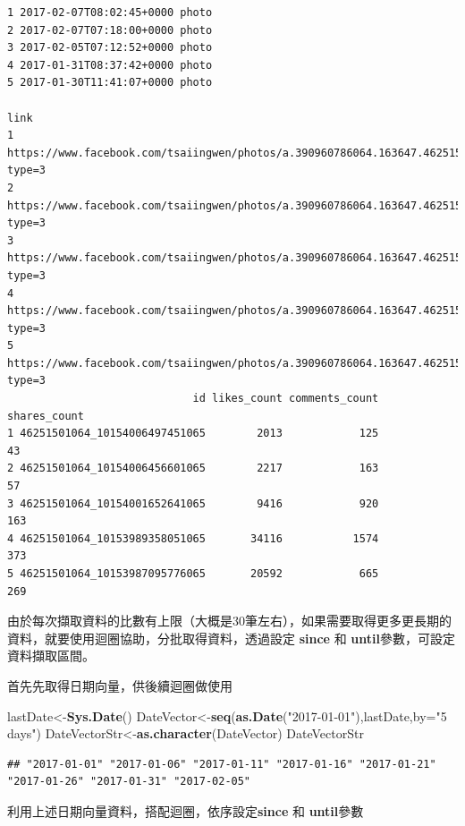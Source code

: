 \documentclass[]{book}
\newenvironment{Shaded}{\begin{snugshade}}{\end{snugshade}}
\newcommand{\KeywordTok}[1]{\textcolor[rgb]{0.13,0.29,0.53}{\textbf{{#1}}}}
\newcommand{\DataTypeTok}[1]{\textcolor[rgb]{0.13,0.29,0.53}{{#1}}}
\newcommand{\StringTok}[1]{\textcolor[rgb]{0.31,0.60,0.02}{{#1}}}
\newcommand{\NormalTok}[1]{{#1}}
\theoremstyle{definition}
\theoremstyle{definition}
\theoremstyle{remark}
\begin{document}
\begin{verbatim}
1 2017-02-07T08:02:45+0000 photo
2 2017-02-07T07:18:00+0000 photo
3 2017-02-05T07:12:52+0000 photo
4 2017-01-31T08:37:42+0000 photo
5 2017-01-30T11:41:07+0000 photo
                                                                                                    link
1 https://www.facebook.com/tsaiingwen/photos/a.390960786064.163647.46251501064/10154006497206065/?type=3
2 https://www.facebook.com/tsaiingwen/photos/a.390960786064.163647.46251501064/10154006455396065/?type=3
3 https://www.facebook.com/tsaiingwen/photos/a.390960786064.163647.46251501064/10154001652641065/?type=3
4 https://www.facebook.com/tsaiingwen/photos/a.390960786064.163647.46251501064/10153989357181065/?type=3
5 https://www.facebook.com/tsaiingwen/photos/a.390960786064.163647.46251501064/10153987089121065/?type=3
                             id likes_count comments_count shares_count
1 46251501064_10154006497451065        2013            125           43
2 46251501064_10154006456601065        2217            163           57
3 46251501064_10154001652641065        9416            920          163
4 46251501064_10153989358051065       34116           1574          373
5 46251501064_10153987095776065       20592            665          269
\end{verbatim}

由於每次擷取資料的比數有上限（大概是30筆左右），如果需要取得更多更長期的資料，就要使用迴圈協助，分批取得資料，透過設定
\textbf{since} 和 \textbf{until}參數，可設定資料擷取區間。

首先先取得日期向量，供後續迴圈做使用

\begin{Shaded}
\begin{Highlighting}[]
\NormalTok{lastDate<-}\KeywordTok{Sys.Date}\NormalTok{()}
\NormalTok{DateVector<-}\KeywordTok{seq}\NormalTok{(}\KeywordTok{as.Date}\NormalTok{(}\StringTok{"2017-01-01"}\NormalTok{),lastDate,}\DataTypeTok{by=}\StringTok{"5 days"}\NormalTok{)}
\NormalTok{DateVectorStr<-}\KeywordTok{as.character}\NormalTok{(DateVector)}
\NormalTok{DateVectorStr}
\end{Highlighting}
\end{Shaded}

\begin{verbatim}
## "2017-01-01" "2017-01-06" "2017-01-11" "2017-01-16" "2017-01-21" "2017-01-26" "2017-01-31" "2017-02-05"
\end{verbatim}

利用上述日期向量資料，搭配迴圈，依序設定\textbf{since} 和
\textbf{until}參數
\end{document}
